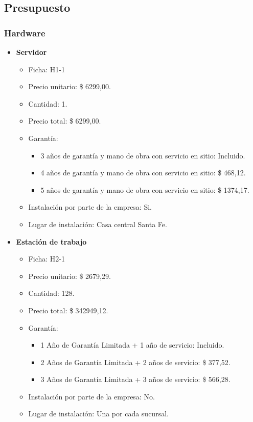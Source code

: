 \subsection{Presupuesto}

\subsubsection{Hardware}
\begin{itemize}
  \item \textbf{Servidor}
    \begin{itemize}
      \item Ficha: H1-1
      \item Precio unitario: \$ 6299,00.
      \item Cantidad: 1.
      \item Precio total: \$ 6299,00.
      \item Garantía:
        \begin{itemize}
          \item 3 años de garantía y mano de obra con servicio en sitio: Incluido.
          \item 4 años de garantía y mano de obra con servicio en sitio: \$  468,12.
          \item 5 años de garantía y mano de obra con servicio en sitio: \$ 1374,17.
        \end{itemize}
      \item Instalación por parte de la empresa: Si.
      \item Lugar de instalación: Casa central Santa Fe.
    \end{itemize}
  
  \item \textbf{Estación de trabajo}
    \begin{itemize}
      \item Ficha: H2-1
      \item Precio unitario: \$ 2679,29.
      \item Cantidad: 128.
      \item Precio total: \$ 342949,12.
      
      \item Garantía:
        \begin{itemize}
          \item 1 Año de Garantía Limitada + 1 año de servicio: Incluido.
          \item 2 Años de Garantía Limitada + 2 años de servicio: \$ 377,52.
          \item 3 Años de Garantía Limitada + 3 años de servicio: \$ 566,28.
        \end{itemize}
      \item Instalación por parte de la empresa: No.
      \item Lugar de instalación: Una por cada sucursal.
    \end{itemize}
  

\end{itemize}
